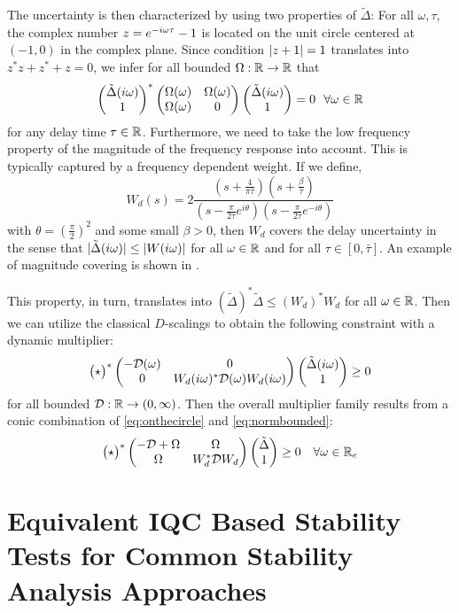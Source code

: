 The uncertainty is then characterized by using two properties of $\tilde \Delta$: For all 
$\omega,\tau$, the complex number $z=e^{-i\omega{\tau}}-1$ is located on the unit circle centered 
at $(-1,0)$ in the complex plane. Since condition $\displaystyle \left|z+1\right|=1$ translates into $z^*z+z^*+z=0$, 
we infer for all bounded $\Omega:\mathbb{R}\to\mathbb{R}$ that
\begin{equation}
\begin{pmatrix}\tilde{\Delta}(i\omega)\\1\end{pmatrix}^*\begin{pmatrix}\Omega(\omega) &\Omega(\omega)\\ \Omega(\omega) &0\end{pmatrix}
\begin{pmatrix}\tilde{\Delta}(i\omega)\\1\end{pmatrix} = 0\ \ \forall\omega\in\mathbb{R}
\label{eq:onthecircle}
\end{equation}
for any delay time $\tau\in\mathbb{R}$. Furthermore, we need to take the low frequency property of the 
magnitude of the frequency response into account. This is typically captured by a frequency dependent 
weight. If we define,
\begin{equation*}
W_d(s)= 2\frac{(s+ \frac{4}{\pi\bar{\tau}}) (s+ \frac{\beta}{\bar{\tau}})}%
{(s-\frac{\pi}{2\bar{\tau}}e^{i\theta})(s-\frac{\pi}{2\bar{\tau}}e^{-i\theta})}
\end{equation*}
with $\theta=\left( \frac{\pi}{2}\right)^2$ and some small $\beta>0$, then $W_d$ covers the delay 
uncertainty in the sense that $|\tilde{\Delta}(i\omega)|\leq |W(i\omega)|$ for all $\omega\in\mathbb{R}$ and 
for all $\tau\in [0,\bar{\tau}]$. An example of magnitude covering is shown in .

This property, in turn, translates into $(\tilde{\Delta})^*\tilde{\Delta}\leq (W_d)^*W_d$ for all 
$\omega\in\mathbb{R}$. Then we can utilize the classical $D$-scalings to obtain the following constraint 
with a dynamic multiplier:
\begin{equation}
\begin{pmatrix}\star\end{pmatrix}^*\begin{pmatrix}-\mathcal{D}(\omega) &0\\0 &W_d(i\omega)^*\mathcal{D}(\omega)W_d(i\omega)\end{pmatrix}
\begin{pmatrix}\tilde{\Delta}(i\omega)\\1\end{pmatrix} \geq 0
\label{eq:normbounded}
\end{equation}
for all bounded $\mathcal{D}:\mathbb{R}\to (0,\infty)$. Then the overall multiplier family results from a 
conic combination of \eqref{eq:onthecircle} and \eqref{eq:normbounded}:
\[
\begin{pmatrix}\star\end{pmatrix}^*\begin{pmatrix}-\mathcal{D}+\Omega &\Omega\\
\Omega &W_d^*\mathcal{D}W_d\end{pmatrix}\begin{pmatrix}\tilde{\Delta}\\1\end{pmatrix}
\geq 0 \quad \forall\omega\in\mathbb{R}_e
\]

\section{Equivalent IQC Based Stability Tests for Common Stability Analysis Approaches}
